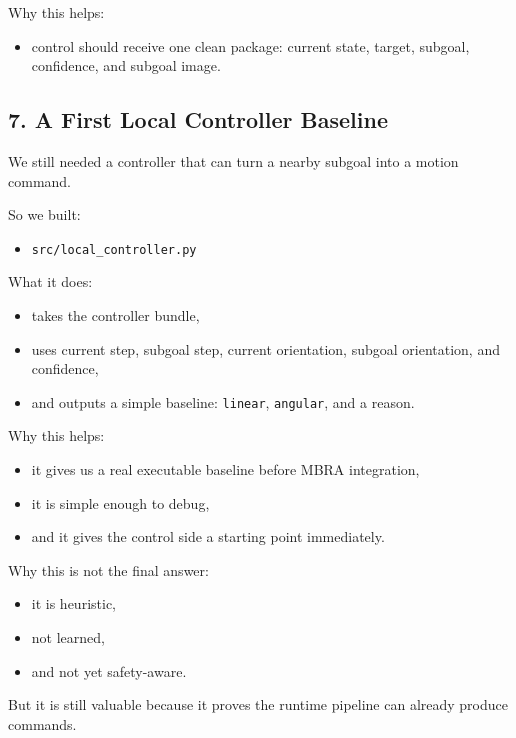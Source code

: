 \documentclass[11pt,a4paper]{article}
\begin{document}
Why this helps:

\begin{itemize}[nosep]
  \item control should receive one clean package:
        current state, target, subgoal, confidence, and subgoal image.
\end{itemize}


\subsection{7. A First Local Controller Baseline}

We still needed a controller that can turn a nearby subgoal into a motion
command.

So we built:

\begin{itemize}[nosep]
  \item \texttt{src/local\_controller.py}
\end{itemize}

What it does:

\begin{itemize}[nosep]
  \item takes the controller bundle,
  \item uses current step, subgoal step, current orientation, subgoal
        orientation, and confidence,
  \item and outputs a simple baseline:
        \texttt{linear}, \texttt{angular}, and a reason.
\end{itemize}

Why this helps:

\begin{itemize}[nosep]
  \item it gives us a real executable baseline before MBRA integration,
  \item it is simple enough to debug,
  \item and it gives the control side a starting point immediately.
\end{itemize}

Why this is not the final answer:

\begin{itemize}[nosep]
  \item it is heuristic,
  \item not learned,
  \item and not yet safety-aware.
\end{itemize}

But it is still valuable because it proves the runtime pipeline can already
produce commands.
\end{document}
